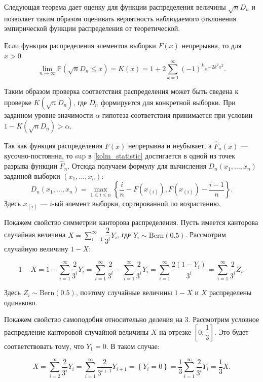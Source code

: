 Следующая теорема дает оценку для функции распределения величины
 $ \sqrt{n} D_n $ и позволяет таким образом оценивать вероятность
 наблюдаемого отклонения эмпирической функции распределения от теоретической.
\begin{theorem}
     Если функция распределения элементов выборки $ F(x) $ непрерывна, то
     для $ x > 0 $
     $$
     \displaystyle\lim_{n \to \infty}\mathbb{P}(\sqrt{n}D_n \le x) = K(x) = 1 +
     2 \displaystyle\sum_{k = 1}^{\infty}(-1)^k e^{-2k^2x^2}.
     $$
\end{theorem}
Таким образом проверка соответствия распределения может быть сведена
 к проверке $ K(\sqrt{n} D_n) $, где $ D_n $ формируется для конкретной
 выборки. При заданном уровне значимости $ \alpha $ гипотеза соответствия
 принимается при условии $ 1 - K(\sqrt{n} D_n) > \alpha. $

Так как функция распределения $ F(x) $ непрерывна и неубывает, а $ \hat{F}_n(x) $ ---
 кусочно-постоянна, то sup в \eqref{kolm_statistic} достигается в одной из точек
 разрыва функции $ \hat{F}_n $. Отсюда получаем формулу для вычисления
 $ D_n(x_1, \dots, x_n) $ заданной выборки $ (x_1, \dots, x_n) $:
$$
D_n(x_1, \dots, x_n) = \max_{1 \le i \le n} \left\{ \frac{i}{n} - 
 F(x_{(i)}), F(x_{(i)}) - \frac{i - 1}{n} \right\}.
$$
Здесь $ x_{(i)} $ --- $ i $-ый элемент выборки, сортированной по возрастанию. 

Покажем свойство симметрии канторова распределения. Пусть имеется канторова случайная
 величина $ X = \displaystyle\sum_{i = 1}^{\infty} \dfrac{2}{3^i} Y_i $, где $ Y_i
 \sim \mathrm{Bern}(0.5) $. Рассмотрим случайную величину $ 1 - X $:

$$ 
1 - X = 1 - \sum_{i = 1}^{\infty} \dfrac{2}{3^i} Y_i = \sum_{i = 1}^{\infty}
 \dfrac{2}{3^i} - \sum_{i = 1}^{\infty} \dfrac{2}{3^i} Y_i = \sum_{i = 1}^{\infty}
 \dfrac{2(1 - Y_i)}{3^i} = \sum_{i = 1}^{\infty} \dfrac{2}{3^i} Z_i. 
$$

Здесь $ Z_i \sim \mathrm{Bern}(0.5) $, поэтому случайные величины $ 1-X $ и $ X $
 распределены одинаково.

Покажем свойство самоподобия относительно деления на 3. Рассмотрим условное
 распредление канторовой случайной величины $ X $ на отрезке 
 $ \left[0; \dfrac{1}{3}\right] $. Это будет соответствовать тому, что
 $ Y_1 = 0 $. В таком случае:

$$ 
X = \sum_{i = 2}^{\infty} \dfrac{2}{3^i} Y_i = \sum_{i = 1}^{\infty}
 \dfrac{2}{3^{i+1}} Y_{i+1} = \left\{ Y_i = 0 \right\} = \dfrac{1}{3}
 \sum_{i = 1}^{\infty} \dfrac{2}{3^i} Y_i = \dfrac{1}{3} X.
$$

